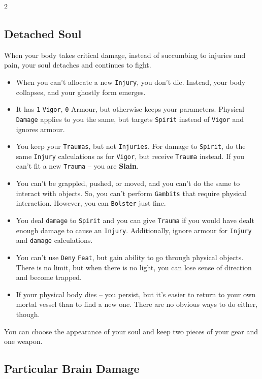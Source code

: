 \begin{multicols*}{2}

    \subsection*{Detached Soul}

    When your body takes critical damage, instead of succumbing to injuries and pain, your soul detaches and continues to fight.

    \begin{itemize}[nosep, leftmargin=*]
        \item When you can't allocate a new \texttt{Injury}, you don't die. Instead, your body collapses, and your ghostly form emerges.
        \item It has \texttt{1} \texttt{Vigor}, \texttt{0} Armour, but otherwise keeps your parameters.
              Physical \texttt{Damage} applies to you the same, but targets \texttt{Spirit} instead of \texttt{Vigor} and ignores armour.
        \item You keep your \texttt{Traumas}, but not \texttt{Injuries}. For damage to \texttt{Spirit}, do the same \texttt{Injury} calculations as for \texttt{Vigor}, but receive \texttt{Trauma} instead. If you can't fit a new \texttt{Trauma} -- you are \textbf{Slain}.
        \item You can't be grappled, pushed, or moved, and you can't do the same to interact with objects. So, you can't perform \texttt{Gambits} that require physical interaction. However, you can \texttt{Bolster} just fine.
        \item You deal \texttt{damage} to \texttt{Spirit} and you can give \texttt{Trauma} if you would have dealt enough damage to cause an \texttt{Injury}. Additionally, ignore armour for \texttt{Injury} and \texttt{damage} calculations.
        \item You can't use \texttt{Deny} \texttt{Feat}, but gain ability to go through physical objects.
              There is no limit, but when there is no light, you can lose sense of direction and become trapped.
        \item If your physical body dies -- you persist, but it's easier to return to your own mortal vessel than to find a new one. There are no obvious ways to do either, though.
    \end{itemize}
You can choose the appearance of your soul and keep two pieces of your gear and one weapon.

    \subsection*{Particular Brain Damage}


\end{multicols*}
